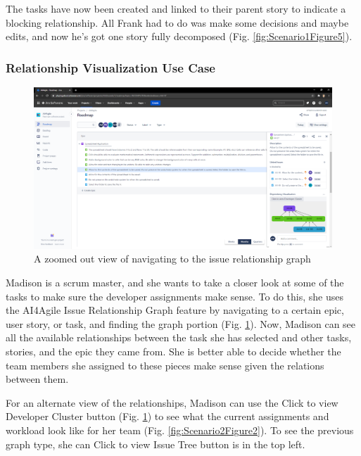 The tasks have now been created and linked to their parent story to indicate a blocking relationship. All Frank had to do was make some decisions and maybe edits, and now he’s got one story fully decomposed (Fig. \ref{fig:Scenario1Figure5}).

\subsubsection{Relationship Visualization Use Case}
\label{Scenario2}

\begin{figure}
\centering
\includegraphics[width=\textwidth,keepaspectratio]{./figure/Scenario2Figure1.png}
\caption{A zoomed out view of navigating to the issue relationship graph}
\label{fig:Scenario2Figure1}
\end{figure}

Madison is a scrum master, and she wants to take a closer look at some of the tasks to make sure the developer assignments make sense. To do this, she uses the AI4Agile Issue Relationship Graph feature by navigating to a certain epic, user story, or task, and finding the graph portion (Fig. \ref{fig:Scenario2Figure1}). Now, Madison can see all the available relationships between the task she has selected and other tasks, stories, and the epic they came from. She is better able to decide whether the team members she assigned to these pieces make sense given the relations between them.

For an alternate view of the relationships, Madison can use the Click to view Developer Cluster button (Fig. \ref{fig:Scenario2Figure1}) to see what the current assignments and workload look like for her team (Fig. \ref{fig:Scenario2Figure2}). To see the previous graph type, she can Click to view Issue Tree button is in the top left.

